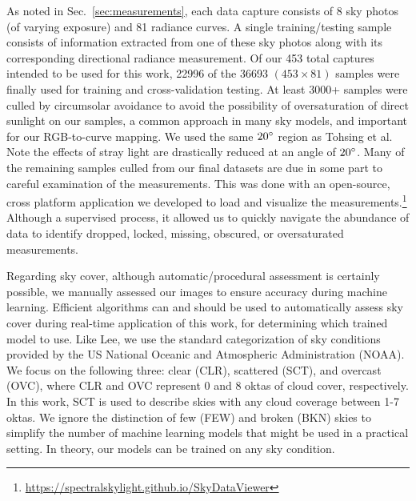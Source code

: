 As noted in Sec.~\ref{sec:measurements}, each data capture consists of 8 sky photos (of varying exposure) and 81 radiance curves. A single training/testing sample consists of information extracted from one of these sky photos along with its corresponding directional radiance measurement. Of our 453 total captures intended to be used for this work, 22996 of the 36693 $(453\times81)$ samples were finally used for training and cross-validation testing. At least 3000+ samples were culled by circumsolar avoidance to avoid the possibility of oversaturation of direct sunlight on our samples, a common approach in many sky models,\cite{chauvin_modelling_2015} and important for our RGB-to-curve mapping. We used the same $20\degree$ region as Tohsing et al.\cite{tohsing_validation_2014} Note the effects of stray light are drastically reduced at an angle of $20\degree$.\cite{saito_estimation_2016} Many of the remaining samples culled from our final datasets are due in some part to careful examination of the measurements. This was done with an open-source, cross platform application we developed to load and visualize the measurements.\footnote{\url{https://spectralskylight.github.io/SkyDataViewer}} Although a supervised process, it allowed us to quickly navigate the abundance of data to identify dropped, locked, missing, obscured, or oversaturated measurements.

Regarding sky cover, although automatic/procedural assessment is certainly possible,\cite{yamashita_cloud, tohsing_validation_2014, saito_cloud, li_cloud, cazorla_development_2008, arking_cloudcover} we manually assessed our images to ensure accuracy during machine learning. Efficient algorithms can and should be used to automatically assess sky cover during real-time application of this work, for determining which trained model to use. Like Lee,\cite{lee_jr_measuring_2008} we use the standard categorization of sky conditions provided by the US National Oceanic and Atmospheric Administration (NOAA).\cite{noaa_fmh1chpt9_2017} We focus on the following three: clear (CLR), scattered (SCT), and overcast (OVC), where CLR and OVC represent 0 and 8 oktas of cloud cover, respectively.\cite{noaa_fmh1chpt9_2017} In this work, SCT is used to describe skies with any cloud coverage between 1-7 oktas. We ignore the distinction of few (FEW) and broken (BKN) skies to simplify the number of machine learning models that might be used in a practical setting. In theory, our models can be trained on any sky condition.

